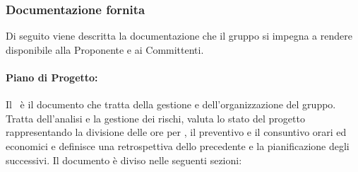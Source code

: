 \subsubsection{Documentazione fornita}\label{documentazionefornita}
Di seguito viene descritta la documentazione che il gruppo si impegna a rendere disponibile alla Proponente e ai Committenti.

\paragraph{Piano di Progetto:}
Il \PdP\ è il documento che tratta della gestione e dell'organizzazione del gruppo. Tratta dell'analisi e la gestione dei rischi, valuta lo stato del progetto rappresentando la divisione delle ore per , il preventivo e il consuntivo orari ed economici e definisce una retrospettiva dello  precedente e la pianificazione degli  successivi.
Il documento è diviso nelle seguenti sezioni:
